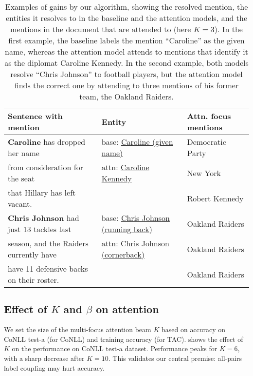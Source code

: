 \begin{table*}[ht!]
\centering
\begin{tabular}{l|l|l}
 Sentence with mention & { Entity}  & {Attn. focus mentions} \\  
 \hline
{\bf Caroline} has dropped her name 
& base: \href{https://en.wikipedia.org/wiki/Caroline_(given_name)}{Caroline (given name)} 
&  Democratic Party\\ 
from consideration for the seat   
& attn: \href{https://en.wikipedia.org/wiki/Caroline_Kennedy}{Caroline Kennedy}
& New York \\
that Hillary has left vacant. & & Robert Kennedy \\ \hline
{\bf Chris Johnson} had just 13 tackles last 
& base: \href{https://en.wikipedia.org/wiki/Chris_Johnson_(running_back)}{Chris Johnson (running back)}
& Oakland Raiders  \\
season, and the Raiders currently have 
& attn: \href{https://en.wikipedia.org/wiki/Chris_Johnson_(cornerback)}{Chris Johnson (cornerback)}
& Oakland Raiders \\
have 11 defensive backs on their roster. & & Oakland Raiders
\end{tabular}
\caption{\label{table:examples}{\small{Examples of gains by our algorithm, showing the resolved mention,
the entities it resolves to in the baseline and the attention models,
and the mentions in the document that are attended to (here $K=3$). In the first example, the baseline labels the mention ``Caroline'' as the given name, whereas
the attention model attends to mentions that identify it as the diplomat Caroline Kennedy. In the second
example, both models resolve ``Chris Johnson'' to football players, but the attention model finds the correct one by attending to three mentions of his former team, the Oakland Raiders.}}}
\end{table*}


\subsection{Effect of $K$ and $\beta$ on attention}

We set the size of the multi-focus attention beam $K$ based on accuracy on
CoNLL test-a (for CoNLL) and training accuracy (for TAC). 
 shows the effect of $K$ on the performance on 
CoNLL test-a dataset. 
Performance peaks for $K = 6$, with a sharp decrease after
$K=10$.  This validates our central premise: all-pairs label coupling
may hurt accuracy.

